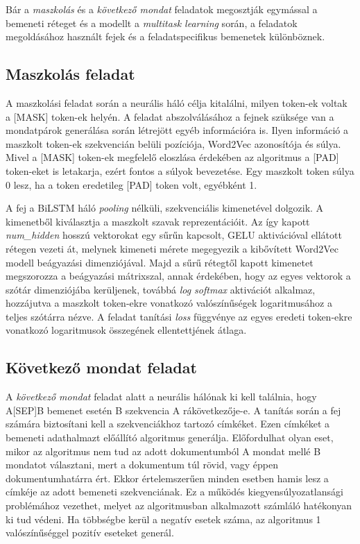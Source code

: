 Bár a \textit{maszkolás} és a \textit{következő mondat} feladatok megosztják egymással a bemeneti réteget és a modellt a \textit{multitask learning} során, a feladatok megoldásához használt fejek és a feladatspecifikus bemenetek különböznek.

\subsection{Maszkolás feladat}

A maszkolási feladat során a neurális háló célja kitalálni, milyen token-ek voltak a [MASK] token-ek helyén. A feladat abszolválásához a fejnek szüksége van a mondatpárok generálása során létrejött egyéb információra is. Ilyen információ a maszkolt token-ek szekvencián belüli pozíciója, Word2Vec azonosítója és súlya. Mivel a [MASK] token-ek megfelelő eloszlása érdekében az algoritmus a [PAD] token-eket is letakarja, ezért fontos a súlyok bevezetése. Egy maszkolt token súlya 0 lesz, ha a token eredetileg [PAD] token volt, egyébként 1. 

A fej a BiLSTM háló \textit{pooling} nélküli, szekvenciális kimenetével dolgozik. A kimenetből kiválasztja a maszkolt szavak reprezentációit. Az így kapott \textit{num\_hidden} hosszú vektorokat egy sűrűn kapcsolt, GELU aktivációval ellátott rétegen vezeti át, melynek kimeneti mérete megegyezik a kibővített Word2Vec modell beágyazási dimenziójával. Majd a sűrű rétegtől kapott kimenetet megszorozza a beágyazási mátrixszal, annak érdekében, hogy az egyes vektorok a szótár dimenziójába kerüljenek, továbbá \textit{log softmax} aktivációt alkalmaz, hozzájutva a maszkolt token-ekre vonatkozó valószínűségek logaritmusához a teljes szótárra nézve. A feladat tanítási \textit{loss} függvénye az egyes eredeti token-ekre vonatkozó logaritmusok összegének ellentettjének átlaga.


\subsection{Következő mondat feladat}

A \textit{következő mondat} feladat alatt a neurális hálónak ki kell találnia, hogy A[SEP]B bemenet esetén B szekvencia A rákövetkezője-e. A tanítás során a fej számára biztosítani kell a szekvenciákhoz tartozó címkéket. Ezen címkéket a bemeneti adathalmazt előállító algoritmus generálja. Előfordulhat olyan eset, mikor az algoritmus nem tud az adott dokumentumból A mondat mellé B mondatot választani, mert a dokumentum túl rövid, vagy éppen dokumentumhatárra ért. Ekkor értelemszerűen minden esetben hamis lesz a címkéje az adott bemeneti szekvenciának. Ez a működés kiegyensúlyozatlansági problémához vezethet, melyet az algoritmusban alkalmazott számláló hatékonyan ki tud védeni. Ha többségbe kerül a negatív esetek száma, az algoritmus 1 valószínűséggel pozitív eseteket generál. 

